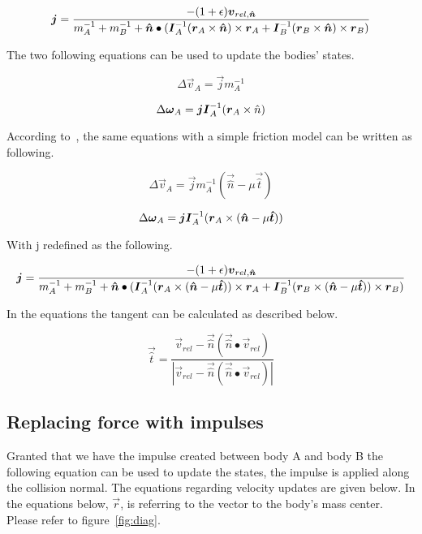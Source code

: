 \begin{equation}
  \boldsymbol{j} = \frac{-(1+\epsilon)\boldsymbol{v}_{rel,\boldsymbol{\hat{n}}}}
  {m_A^{-1}+m_B^{-1}+\boldsymbol{\hat{n}}\bullet(\boldsymbol{I}_A^{-1}(\boldsymbol{r}_A\times\boldsymbol{\hat{n}})\times\boldsymbol{r}_A
  +\boldsymbol{I}_B^{-1}(\boldsymbol{r}_B\times\boldsymbol{\hat{n}})\times\boldsymbol{r}_B)}
\end{equation}

The two following equations can be used to update the bodies' states.

\begin{equation}
  \Delta\vec{v}_A = \vec{j}m_A^{-1}
\end{equation}

\begin{equation}
  \Delta\boldsymbol{\omega}_A = \boldsymbol{j}\boldsymbol{I}_A^{-1}(\boldsymbol{r}_A\times\hat{n})
\end{equation}

According to~\cite{hansson}, the same equations with a simple friction model can
be written as following.

\begin{equation}
  \Delta\vec{v}_A = \vec{j}m_A^{-1}(\vec{\hat{n}} - \mu\vec{\hat{t}})
\end{equation}

\begin{equation}
  \Delta\boldsymbol{\omega}_A = \boldsymbol{j}\boldsymbol{I}_A^{-1}(\boldsymbol{r}_A\times(\boldsymbol{\hat{n}}-\mu\boldsymbol{\hat{t}}))
\end{equation}

With j redefined as the following.

\begin{equation}\label{eq:j}
  \boldsymbol{j} = \frac{-(1+\epsilon)\boldsymbol{v}_{rel,\boldsymbol{\hat{n}}}}
  {m_A^{-1}+m_B^{-1}+\boldsymbol{\hat{n}}\bullet(\boldsymbol{I}_A^{-1}(\boldsymbol{r}_A\times(\boldsymbol{\hat{n}}-\mu\boldsymbol{\hat{t}}))\times\boldsymbol{r}_A
  +\boldsymbol{I}_B^{-1}(\boldsymbol{r}_B\times(\boldsymbol{\hat{n}}-\mu\boldsymbol{\hat{t}}))\times\boldsymbol{r}_B)}
\end{equation}

In the equations the tangent can be calculated as described below.

\begin{equation}
  \vec{\hat{t}}=\frac{\vec{v}_{rel}-\vec{\hat{n}}(\vec{\hat{n}}\bullet\vec{v}_{rel})}{|\vec{v}_{rel}-\vec{\hat{n}}(\vec{\hat{n}}\bullet\vec{v}_{rel})|}
\end{equation}

\subsection{Replacing force with impulses}
Granted that we have the impulse created between body A and body B the following
equation can be used to update the states, the impulse is applied along the collision normal.
The equations regarding velocity updates are given below. In the equations below, $\vec{r}$,
is referring to the vector to the body's mass center. Please refer to figure~\ref{fig:diag}.

